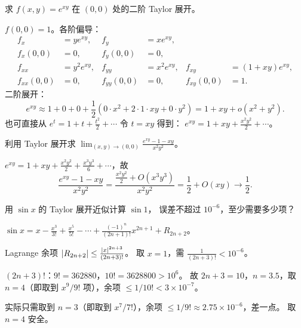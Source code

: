 \documentclass{ctexart}
\begin{document}
\begin{exercise}[多元 Taylor 展开]
  求 $f(x,y) = e^{xy}$ 在 $(0,0)$ 处的二阶 Taylor 展开。
\end{exercise}

\begin{solution}
  $f(0,0)=1$。各阶偏导：
  \begin{align*}
    f_x &= ye^{xy}, & f_y &= xe^{xy}, \\
    f_x(0,0) &= 0, & f_y(0,0) &= 0, \\
    f_{xx} &= y^2 e^{xy}, & f_{yy} &= x^2 e^{xy}, & f_{xy} &= (1+xy)e^{xy}, \\
    f_{xx}(0,0) &= 0, & f_{yy}(0,0) &= 0, & f_{xy}(0,0) &= 1.
  \end{align*}
  二阶展开：
  \[
    e^{xy} \approx 1 + 0 + 0 + \frac{1}{2}(0 \cdot x^2 + 2 \cdot 1 \cdot xy + 0 \cdot y^2)
    = 1 + xy + o(x^2+y^2).
  \]
  也可直接从 $e^t = 1 + t + \frac{t^2}{2} + \cdots$ 令 $t=xy$ 得到：
  $e^{xy} = 1 + xy + \frac{x^2y^2}{2} + \cdots$。
\end{solution}

\begin{exercise}
  利用 Taylor 展开求 $\displaystyle\lim_{(x,y)\to(0,0)} \frac{e^{xy}-1-xy}{x^2 y^2}$。
\end{exercise}

\begin{solution}
  $e^{xy} = 1 + xy + \frac{x^2y^2}{2} + \frac{x^3y^3}{6} + \cdots$，故
  \[
    \frac{e^{xy} - 1 - xy}{x^2 y^2}
    = \frac{\frac{x^2y^2}{2} + O(x^3y^3)}{x^2y^2}
    = \frac{1}{2} + O(xy) \to \frac{1}{2}.
  \]
\end{solution}

\begin{exercise}
  用 $\sin x$ 的 Taylor 展开近似计算 $\sin 1$，
  误差不超过 $10^{-6}$，至少需要多少项？
\end{exercise}

\begin{solution}
  $\sin x = x - \frac{x^3}{3!} + \frac{x^5}{5!} - \cdots
  + \frac{(-1)^n}{(2n+1)!} x^{2n+1} + R_{2n+2}$。

  Lagrange 余项 $\left| R_{2n+2} \right| \le \frac{\left| x \right|^{2n+3}}{(2n+3)!}$。
  取 $x = 1$，需 $\frac{1}{(2n+3)!} < 10^{-6}$。

  $(2n+3)!$：$9! = 362880$，$10! = 3628800 > 10^6$。
  故 $2n+3 = 10$，$n = 3.5$，取 $n = 4$（即取到 $x^9/9!$ 项），余项 $\le 1/10! < 3 \times 10^{-7}$。

  实际只需取到 $n=3$（即取到 $x^7/7!$），余项 $\le 1/9! \approx 2.75 \times 10^{-6}$，差一点。
  取 $n=4$ 安全。
\end{solution}
\end{document}
